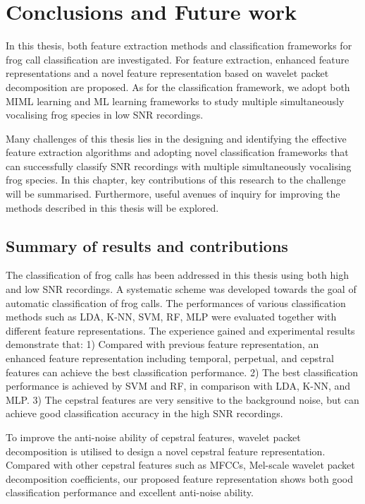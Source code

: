 
\chapter[Conclusions and Future work]{Conclusions and Future work}
\label{cha:cha8Conclusions}



In this thesis, both feature extraction methods and classification frameworks for frog call classification are investigated. For feature extraction, enhanced feature representations and a novel feature representation based on wavelet packet decomposition are proposed. As for the classification framework, we adopt both MIML learning and ML learning  frameworks to study multiple simultaneously vocalising frog species in low SNR recordings. 

Many challenges of this thesis lies in the designing and identifying the effective feature extraction algorithms and adopting novel classification frameworks that can successfully classify SNR recordings with multiple simultaneously vocalising frog species. 
In this chapter, key contributions of this research to the challenge will be summarised. Furthermore, useful avenues of inquiry for improving the methods described in this thesis will be explored.

\section{Summary of results and contributions}
	
The classification of frog calls has been addressed in this thesis using both high and low SNR recordings. A systematic scheme was developed towards the goal of automatic classification of frog calls. The performances of various classification methods such as LDA, K-NN, SVM, RF, MLP were evaluated together with different feature representations. The experience gained and experimental results demonstrate that: 1) Compared with previous feature representation, an enhanced feature representation including temporal, perpetual, and cepstral features can achieve the best classification performance. 2) The best classification performance is achieved by SVM and RF, in comparison with LDA, K-NN, and MLP. 3) The cepstral features are very sensitive to the background noise, but can achieve good classification accuracy in the high SNR recordings. 

To improve the anti-noise ability of cepstral features, wavelet packet decomposition is utilised to design a novel cepstral feature representation. Compared with other cepstral features such as MFCCs, Mel-scale wavelet packet decomposition coefficients, our proposed feature representation shows both good classification performance and excellent anti-noise ability. 


